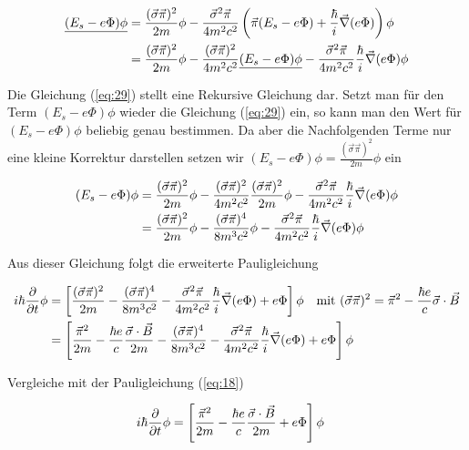 \begin{align}
  \label{eq:29}
  \underline{(E_s-e\Phi)\phi} &= \frac{(\vec\sigma\vec\pi)^2 }{2m}\phi - \frac{\vec\sigma^2\vec\pi }{4m^2c^2}\left(\vec\pi(E_s-e\Phi) + \frac{\hbar}{i}\vec\nabla(e\Phi)\right)  \phi \notag\\
&= \frac{(\vec\sigma\vec\pi)^2 }{2m}\phi - \frac{(\vec\sigma\vec\pi)^2 }{4m^2c^2}\underline{(E_s-e\Phi)\phi}- \frac{\vec\sigma^2\vec\pi }{4m^2c^2}\frac{\hbar}{i}\vec\nabla(e\Phi) \phi 
\end{align}

Die Gleichung (\ref{eq:29}) stellt eine Rekursive Gleichung dar. Setzt man für den Term \((E_s-e\Phi)\phi\) wieder die Gleichung (\ref{eq:29}) ein, so kann man den Wert für \((E_s-e\Phi)\phi\) beliebig genau bestimmen. Da aber die Nachfolgenden Terme nur eine kleine Korrektur darstellen setzen wir \((E_s-e\Phi)\phi = \frac{(\vec\sigma\vec\pi)^2 }{2m}\phi \) ein

\begin{align}
  \label{eq:30}
  (E_s-e\Phi)\phi &= \frac{(\vec\sigma\vec\pi)^2 }{2m}\phi - \frac{(\vec\sigma\vec\pi)^2 }{4m^2c^2} \frac{(\vec\sigma\vec\pi)^2 }{2m}\phi - \frac{\vec\sigma^2\vec\pi }{4m^2c^2}\frac{\hbar}{i}\vec\nabla(e\Phi) \phi  \notag\\
&= \frac{(\vec\sigma\vec\pi)^2 }{2m}\phi - \frac{(\vec\sigma\vec\pi)^4 }{8m^3c^2}\phi - \frac{\vec\sigma^2\vec\pi }{4m^2c^2}\frac{\hbar}{i}\vec\nabla(e\Phi) \phi
\end{align}

Aus dieser Gleichung folgt die erweiterte Pauligleichung

\begin{align}
  \label{eq:31}
  i\hbar \pdiff_t \phi &=  \left[\frac{(\vec\sigma\vec\pi)^2 }{2m} - \frac{(\vec\sigma\vec\pi)^4 }{8m^3c^2} - \frac{\vec\sigma^2\vec\pi }{4m^2c^2}\frac{\hbar}{i}\vec\nabla(e\Phi)  +e\Phi\right]\phi\quad\text{mit }(\vec\sigma\vec\pi)^2 = \vec \pi^2 - \frac{\hbar e}{c}\vec\sigma\cdot\vec B  \notag\\
 &=  \left[\frac{\vec \pi^2}{2m} - \frac{\hbar e}{c}\frac{\vec\sigma\cdot\vec B}{2m} - \frac{(\vec\sigma\vec\pi)^4 }{8m^3c^2} - \frac{\vec\sigma^2\vec\pi }{4m^2c^2}\frac{\hbar}{i}\vec\nabla(e\Phi)  +e\Phi\right]\phi
\end{align}

Vergleiche mit der Pauligleichung (\ref{eq:18})

\begin{align}
  \label{eq:32}
 i\hbar \pdiff_t \phi &= \left[\frac{\vec \pi^2}{2m} - \frac{\hbar e}{c}\frac{\vec\sigma\cdot\vec B}{2m} +e\Phi\right]\phi
\end{align}

